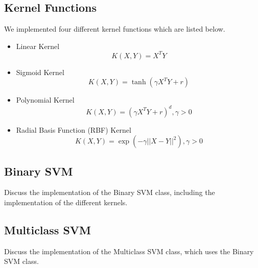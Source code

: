 \documentclass[12pt]{article}
\begin{document}
\subsection{Kernel Functions}
We implemented four different kernel functions which are listed below.
\begin{itemize}
    \item Linear Kernel
    \begin{equation}
    K(X, Y) = X^T Y
    \end{equation}
    
    \item Sigmoid Kernel
    \begin{equation}
    K(X, Y) = \tanh(\gamma X^T Y + r)
    \end{equation}
    
    \item Polynomial Kernel
    \begin{equation}
    K(X, Y) = (\gamma X^T Y + r)^d, \gamma > 0
    \end{equation}
    
    \item Radial Basis Function (RBF) Kernel
    \begin{equation}
    K(X, Y) = \exp(-\gamma ||X - Y||^2), \gamma > 0
    \end{equation}
\end{itemize}
\subsection{Binary SVM}
Discuss the implementation of the Binary SVM class, including the implementation of the different kernels.



\subsection{Multiclass SVM}
Discuss the implementation of the Multiclass SVM class, which uses the Binary SVM class.
\end{document}
